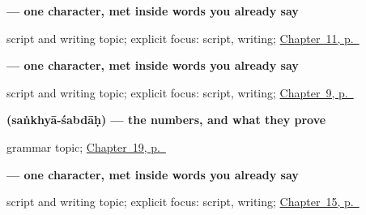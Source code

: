 \noindent\begin{minipage}[t]{\linewidth}
\raggedright
\textbf{ — one character, met inside words you already say}\par
\footnotesize script and writing topic; explicit focus: script, writing; \hyperref[ch:sa-people-nouns]{Chapter~11, p.~\pageref*{ch:sa-people-nouns}}
\end{minipage}\par\smallskip

\noindent\begin{minipage}[t]{\linewidth}
\raggedright
\textbf{ — one character, met inside words you already say}\par
\footnotesize script and writing topic; explicit focus: script, writing; \hyperref[ch:sa-doing-verbs]{Chapter~9, p.~\pageref*{ch:sa-doing-verbs}}
\end{minipage}\par\smallskip

\noindent\begin{minipage}[t]{\linewidth}
\raggedright
\textbf{ (saṅkhyā-śabdāḥ) — the numbers, and what they prove}\par
\footnotesize grammar topic; \hyperref[ch:sa-numbers-6-10]{Chapter~19, p.~\pageref*{ch:sa-numbers-6-10}}
\end{minipage}\par\smallskip

\noindent\begin{minipage}[t]{\linewidth}
\raggedright
\textbf{ — one character, met inside words you already say}\par
\footnotesize script and writing topic; explicit focus: script, writing; \hyperref[ch:sa-describing-things]{Chapter~15, p.~\pageref*{ch:sa-describing-things}}
\end{minipage}\par\smallskip
